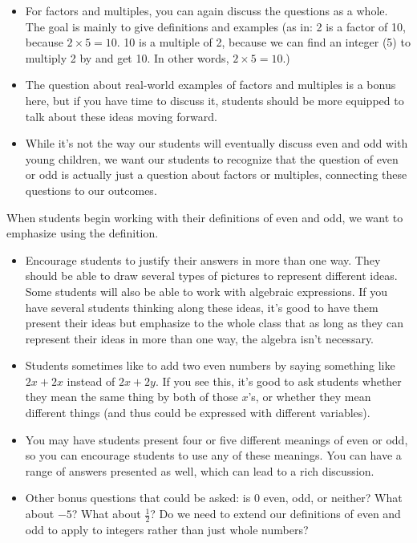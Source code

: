 \documentclass[nooutcomes,noauthor,handout]{ximera}
\begin{document}
\begin{instructorNotes}
\begin{itemize}
As you discuss, you can also label the different levels of these ideas. You will also need to distinguish between what we want as our definition of even and odd, and what we think of more as properties of even and odd. (For instance, students will likely suggest that an even number ends in 0, 2, 4, 6, or 8. This is more like a consequence of our definition than what we want to use as a definition.) To wrap up your work on this definition, be sure to define an odd number as a whole number which is not even.
\item For factors and multiples, you can again discuss the questions as a whole. The goal is mainly to give definitions and examples (as in: 2 is a factor of 10, because $2 \times 5 = 10$. 10 is a multiple of 2, because we can find an integer (5) to multiply 2 by and get 10. In other words, $2 \times 5 = 10$.)
\item The question about real-world examples of factors and multiples is a bonus here, but if you have time to discuss it, students should be more equipped to talk about these ideas moving forward.
\item While it's not the way our students will eventually discuss even and odd with young children, we want our students to recognize that the question of even or odd is actually just a question about factors or multiples, connecting these questions to our outcomes.
\end{itemize}


When students begin working with their definitions of even and odd, we want to emphasize using the definition.
\begin{itemize}
	\item Encourage students to justify their answers in more than one way. They should be able to draw several types of pictures to represent different ideas. Some students will also be able to work with algebraic expressions. If you have several students thinking along these ideas, it's good to have them present their ideas but emphasize to the whole class that as long as they can represent their ideas in more than one way, the algebra isn't necessary.
	\item Students sometimes like to add two even numbers by saying something like $2x + 2x$ instead of $2x + 2y$. If you see this, it's good to ask students whether they mean the same thing by both of those $x$'s, or whether they mean different things (and thus could be expressed with different variables).
	\item You may have students present four or five different meanings of even or odd, so you can encourage students to use any of these meanings. You can have a range of answers presented as well, which can lead to a rich discussion. 
	\item Other bonus questions that could be asked: is $0$ even, odd, or neither? What about $-5$? What about $\frac{1}{2}$? Do we need to extend our definitions of even and odd to apply to integers rather than just whole numbers?
\end{itemize}





\end{instructorNotes}
\end{document}
